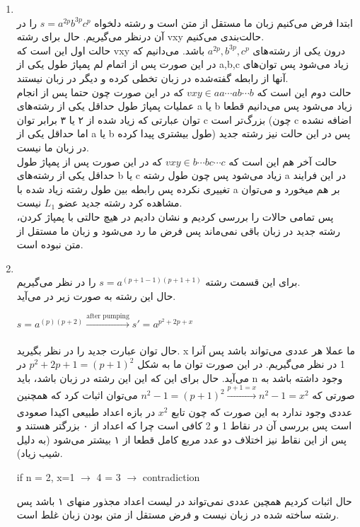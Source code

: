 \begin{enumerate}
    \item \phantom{text}
          \\
          ابتدا فرض می‌کنیم زبان ما مستقل از متن است و رشته دلخواه $s=a^{2p}b^{3p}c^{p}$ را در آن درنظر می‌گیریم. حال برای رشته vxy حالت‌بندی می‌کنیم.
          \\حالت اول این است که vxy درون یکی از رشته‌های $a^{2p},b^{3p},c^{p}$ باشد. می‌دانیم که در این صورت پس از اتمام لم پمپاژ طول یکی از a,b,c زیاد می‌شود پس توان‌های آنها از رابطه گفته‌شده در زبان تخطی کرده و دیگر در زبان نیستند.
          \\
          حالت دوم این است که $vxy \in aa\cdots ab\cdots b $ که در این صورت چون حتما پس از انجام عملیات پمپاژ طول حداقل یکی از رشته‌های a یا b زیاد می‌شود
          پس می‌دانیم قطعا توان عبارتی که زیاد شده از ۲ یا ۳ برابر توان c بزرگ‌تر است (چون c اضافه نشده اما حداقل یکی از a یا b طول بیشتری پیدا کرده) پس در این حالت نیز رشته جدید در زبان ما نیست.\\
          حالت آخر هم این است که $vxy \in b\cdots b c\cdots c$ که در این صورت پس از پمپاژ طول حداقل یکی از رشته‌های b یا c زیاد می‌شود پس چون طول رشته a در این فرایند تغییری نکرده پس رابطه بین طول رشته زیاد شده با a بر هم میخورد و می‌توان مشاهده کرد رشته جدید عضو $L_1$ نیست.
          \\
          پس تمامی حالات را بررسی کردیم و نشان دادیم در هیچ حالتی با پمپاژ کردن، رشته جدید در زبان باقی نمی‌ماند پس فرض ما رد می‌شود و زبان ما مستقل از متن نبوده است.

    \item \phantom{text}
          \\
          برای این قسمت رشته $s=a^{(p+1-1)(p+1+1)}$ را در نظر می‌گیریم.
          \\
          حال این رشته به صورت زیر در می‌آید.
          \\
          \begin{latin}
            $s=a^{(p)(p+2)} \xrightarrow[]{\text{after pumping}}s'=a^{p^2+2p+x}$
          \end{latin}
          حال توان عبارت جدید را در نظر بگیرید. x ما عملا هر عددی می‌تواند باشد پس آنرا 1 در نظر می‌گیریم. در این صورت توان ما به شکل $p^2+2p+1 = (p+1)^2$ در می‌آید.
          حال برای این که این این رشته در زبان باشد، باید n وجود داشته باشد به صورتی که $n^2-1=(p+1)^2\xrightarrow[]{p+1=x}n^2-1=x^2$
          می‌توان اثبات کرد که همچنین عددی وجود ندارد به این صورت که چون تابع $x^2$ در بازه اعداد طبیعی اکیدا صعودی است پس بررسی آن در نقاط 1 و 2 کافی است چرا که اعداد از ۰ بزرگتر هستند و پس از این نقاط نیز اختلاف دو عدد مربع کامل قطعا از ۱ بیشتر می‌شود (به دلیل شیب زیاد).\\
          \begin{latin}
            if n = 2, x=1 $\rightarrow$ 4 = 3 $\rightarrow$ contradiction
          \end{latin}
          حال اثبات کردیم همچین عددی نمی‌تواند در لیست اعداد مجذور منهای ۱ باشد 
          پس رشته ساخته شده در زبان نیست و فرض مستقل از متن بودن زبان غلط است.


\end{enumerate}
